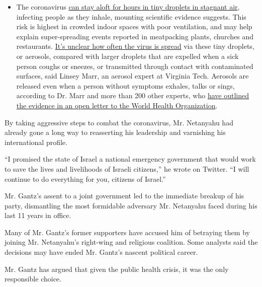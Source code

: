 \begin{itemize}
  \begin{itemize}
  \tightlist
  \item
    The coronavirus
    \href{https://www.nytimes.com/2020/07/04/health/239-experts-with-one-big-claim-the-coronavirus-is-airborne.html?action=click\&pgtype=Article\&state=default\&region=MAIN_CONTENT_3\&context=storylines_faq}{can
    stay aloft for hours in tiny droplets in stagnant air}, infecting
    people as they inhale, mounting scientific evidence suggests. This
    risk is highest in crowded indoor spaces with poor ventilation, and
    may help explain super-spreading events reported in meatpacking
    plants, churches and restaurants.
    \href{https://www.nytimes.com/2020/07/06/health/coronavirus-airborne-aerosols.html?action=click\&pgtype=Article\&state=default\&region=MAIN_CONTENT_3\&context=storylines_faq}{It's
    unclear how often the virus is spread} via these tiny droplets, or
    aerosols, compared with larger droplets that are expelled when a
    sick person coughs or sneezes, or transmitted through contact with
    contaminated surfaces, said Linsey Marr, an aerosol expert at
    Virginia Tech. Aerosols are released even when a person without
    symptoms exhales, talks or sings, according to Dr. Marr and more
    than 200 other experts, who
    \href{https://academic.oup.com/cid/article/doi/10.1093/cid/ciaa939/5867798}{have
    outlined the evidence in an open letter to the World Health
    Organization}.
  \end{itemize}
\end{itemize}

By taking aggressive steps to combat the coronavirus, Mr. Netanyahu had
already gone a long way to reasserting his leadership and varnishing his
international profile.

``I promised the state of Israel a national emergency government that
would work to save the lives and livelihoods of Israeli citizens,'' he
wrote on Twitter. ``I will continue to do everything for you, citizens
of Israel.''

Mr. Gantz's assent to a joint government led to the immediate breakup of
his party, dismantling the most formidable adversary Mr. Netanyahu faced
during his last 11 years in office.

Many of Mr. Gantz's former supporters have accused him of betraying them
by joining Mr. Netanyahu's right-wing and religious coalition. Some
analysts said the decisions may have ended Mr. Gantz's nascent political
career.

Mr. Gantz has argued that given the public health crisis, it was the
only responsible choice.

